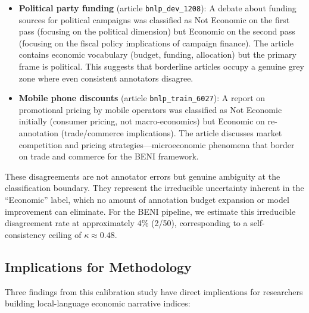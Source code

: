 \begin{itemize}
    \item \textbf{Political party funding} (article \texttt{bnlp\_dev\_1208}): A debate about funding sources for political campaigns was classified as Not Economic on the first pass (focusing on the political dimension) but Economic on the second pass (focusing on the fiscal policy implications of campaign finance). The article contains economic vocabulary (budget, funding, allocation) but the primary frame is political. This suggests that borderline articles occupy a genuine grey zone where even consistent annotators disagree.
    \item \textbf{Mobile phone discounts} (article \texttt{bnlp\_train\_6027}): A report on promotional pricing by mobile operators was classified as Not Economic initially (consumer pricing, not macro-economics) but Economic on re-annotation (trade/commerce implications). The article discusses market competition and pricing strategies---microeconomic phenomena that border on trade and commerce for the BENI framework.
\end{itemize}

These disagreements are not annotator errors but genuine ambiguity at the classification boundary. They represent the irreducible uncertainty inherent in the ``Economic'' label, which no amount of annotation budget expansion or model improvement can eliminate. For the BENI pipeline, we estimate this irreducible disagreement rate at approximately 4\% (2/50), corresponding to a self-consistency ceiling of $\kappa \approx 0.48$.

\subsection{Implications for Methodology}

Three findings from this calibration study have direct implications for researchers building local-language economic narrative indices:

